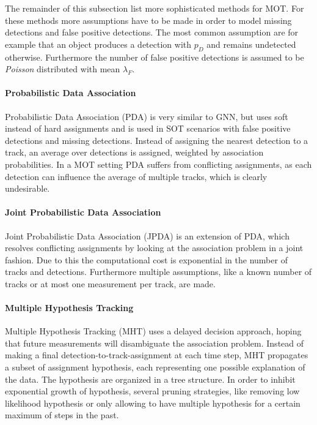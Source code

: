 \documentclass[12pt,a4paper]{article}
\begin{document}
The remainder of this subsection list more sophisticated methods for MOT. For these methods more assumptions have to be made in order to model missing detections and false positive detections. The most common assumption are for example that an object produces a detection with $p_D$ and remains undetected otherwise. Furthermore the number of false positive detections is assumed to be \emph{Poisson} distributed with mean $\lambda_F$.

\paragraph{Probabilistic Data Association} Probabilistic Data Association (PDA) is very similar to GNN, but uses soft instead of hard assignments and is used in SOT scenarios with false positive detections and missing detections. Instead of assigning the nearest detection to a track, an average over detections is assigned, weighted by association probabilities. In a MOT setting PDA suffers from conflicting assignments, as each detection can influence the average of multiple tracks, which is clearly undesirable.

\paragraph{Joint Probabilistic Data Association} Joint Probabilistic Data Association (JPDA) \cite{JPDA} is an extension of PDA, which resolves conflicting assignments by looking at the association problem in a joint fashion. Due to this the computational cost is exponential in the number of tracks and detections. Furthermore multiple assumptions, like a known number of tracks or at most one measurement per track, are made. 

\begin{sloppypar}

\paragraph{Multiple Hypothesis Tracking} Multiple Hypothesis Tracking (MHT) \cite{MHT} uses a delayed decision approach, hoping that future measurements will disambiguate the association problem. Instead of making a final detection-to-track-assignment at each time step, MHT propagates a subset of assignment hypothesis, each representing one possible explanation of the data. The hypothesis are organized in a tree structure. In order to inhibit exponential growth of hypothesis, several pruning strategies, like removing low likelihood hypothesis or only allowing to have multiple hypothesis for a certain maximum of steps in the past. 
\end{sloppypar}
\end{document}
